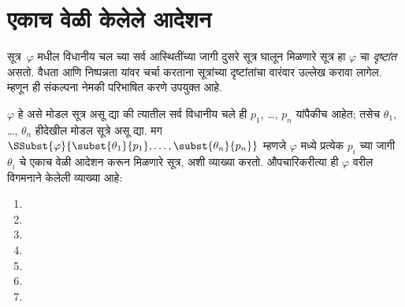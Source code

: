 \section{एकाच वेळी केलेले आदेशन}\label{nml:syn:sub:sec}
सूत्र~$\varphi$ मधील विधानीय चल च्या सर्व
आस्थितींच्या जागी दुसरे सूत्र घालून मिळणारे सूत्र हा
$\varphi$ चा \emph{दृष्टांत} असतो. वैधता आणि निष्पन्नता
यांवर चर्चा करताना सूत्रांच्या दृष्टांतांचा वारंवार
उल्लेख करावा लागेल. म्हणून ही संकल्पना नेमकी परिभाषित
करणे उपयुक्त आहे.
\begin{defn}\label{nml:syn:sub:def:subst-inst}
  $\varphi$ हे असे मोडल सूत्र असू द्या की त्यातील सर्व
  विधानीय चले ही $p_1$, \dots, $p_n$ यांपैकीच
  आहेत; तसेच $\theta_1$, \dots, $\theta_n$ हीदेखील मोडल सूत्रे
  असू द्या. मग
  $\SSubst{\varphi}{\subst{\theta_1}{p_1}, \dots, \subst{\theta_n}{p_n}}$
  म्हणजे $\varphi$ मध्ये प्रत्येक $p_i$ च्या जागी $\theta_i$ चे
  एकाच वेळी आदेशन करून मिळणारे सूत्र, अशी व्याख्या करतो.
  औपचारिकरीत्या ही $\varphi$ वरील विगमनाने केलेली व्याख्या आहे:
  \begin{enumerate}
    \item {}
    \item {}
    \item {}
    \item {}
    \item {}
    \item {}
    \item {}
\end{enumerate}
\end{defn}
